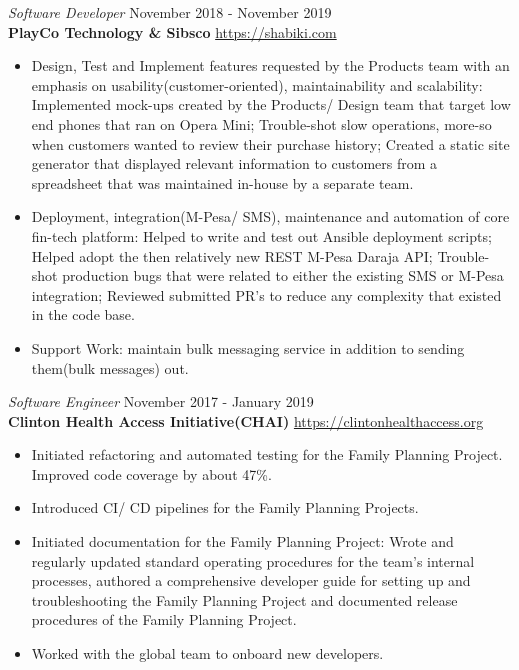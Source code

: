 \documentclass[margin, line]{res} %
\begin{document}

{\sl Software Developer} \hfill November 2018 - November 2019 \\
\textbf{PlayCo Technology \& Sibsco } \hfill \url{https://shabiki.com}
\begin{itemize} \itemsep -2pt
\item Design, Test and Implement features requested by the Products
  team with an emphasis on usability(customer-oriented),
  maintainability and scalability: Implemented mock-ups created by the
  Products/ Design team that target low end phones that ran on
  Opera Mini; Trouble-shot slow operations, more-so when customers
  wanted to review their purchase history; Created a static site
  generator that displayed relevant information to customers from a
  spreadsheet that was maintained in-house by a separate team.
\item Deployment, integration(M-Pesa/ SMS), maintenance and automation
  of core fin-tech platform: Helped to write and test out Ansible
  deployment scripts; Helped adopt the then relatively new REST M-Pesa
  Daraja API; Trouble-shot production bugs that were related to either
  the existing SMS or M-Pesa integration; Reviewed submitted PR’s to
  reduce any complexity that existed in the code base.
\item Support Work: maintain bulk messaging service in addition to
  sending them(bulk messages) out.
\end{itemize}


    {\sl Software Engineer} \hfill November 2017 - January 2019 \\
    \textbf{Clinton Health Access Initiative(CHAI)} \hfill \url{https://clintonhealthaccess.org}
    \begin{itemize} \itemsep -2pt %
    \item Initiated refactoring and automated testing for the Family
      Planning Project. Improved code coverage by about 47\%.
    \item Introduced CI/ CD pipelines for the Family Planning Projects.
    \item Initiated documentation for the Family Planning Project:
      Wrote and regularly updated standard operating procedures for
      the team's internal processes, authored a comprehensive
      developer guide for setting up and troubleshooting the Family
      Planning Project and documented release procedures of the Family
      Planning Project.
    \item Worked with the global team to onboard new developers.
    \end{itemize}
\end{document}
